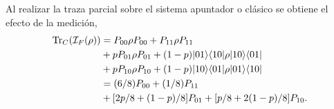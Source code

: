 Al realizar la traza parcial sobre el sistema apuntador o clásico se obtiene el efecto de la medición, \begin{equation}\label{traza_A1_ejemplo1}
    \begin{split}
        {\rm Tr}_C(\mathcal{I}_F(\rho)) &= P_{00} \rho P_{00} + P_{11}\rho P_{11}\\
        &+p P_{01}\rho P_{01}+(1-p) |01\rangle \langle 10|\rho|10\rangle \langle01|\\
        &+p P_{10}\rho P_{10}+(1-p) |10\rangle \langle 01|\rho|01\rangle \langle10|\\
        &=(6/8)P_{00} + (1/8)P_{11}\\
        &+[2p/8 +(1-p)/8]P_{01}+ [p/8+2(1-p)/8]P_{10}.\\
    \end{split}
\end{equation}
\begin{comment} %
Para la segunda alternativa se procede de forma parecida sin embargo el efecto de la medición es diferente, \begin{equation}\label{segunda_alternativa_ejemplo1}
    \begin{split}
        \mathcal{I}_2(\rho)&=\sum_{j,k}\mathcal{F}(P_{a_j,b_k})\otimes P_{a_j,b_k} \rho P_{a_j,b_k}\\
        &=P_{00}\otimes P_{00} \la 00|\rho|00\ra + P_{11}\otimes P_{11} \la 11|\rho|11\ra\\
        &+P_{01} \otimes [pP_{01} \la 01|\rho|01\ra+(1-p)P_{10}\la 10|\rho|10\ra]\\
        &+P_{10} \otimes [p P_{10}\la 10|\rho|10\ra+(1-p)P_{01}\la 01|\rho|01\ra]\\
        &=P_{00}\otimes (6/8)P_{00} + P_{11}\otimes (1/8)P_{11}\\
        &+   P_{01} \otimes [2p/8P_{01} +(1-p)/8P_{10}]+P_{10} \otimes[p/8 P_{10}+2(1-p)/8 P_{01}].\\
    \end{split}
\end{equation}


De nuevo, al realizar la traza parcial sobre le sistema cuántico se obtendrá la probabilidad de cada una de las salidas posibles \begin{equation}\label{traza_S2_ejemplo1}
    \begin{split}
        \tr_Q(\mathcal{I}_2(\rho)) &= P_{00} \la 00|\rho|00\ra + P_{11} \la 11|\rho|11\ra\\
        &+P_{01}[p \la 01|\rho|01\ra+(1-p)\la 10|\rho|10\ra]\\
        &+P_{10}[p \la 10|\rho|10\ra+(1-p)\la 01|\rho|01\ra]\\
        &=(6/8)P_{00} + (1/8)P_{11}\\
        &+[2p/8 +(1-p)/8]P_{01}+ [p/8+2(1-p)/8]P_{10}.\\
    \end{split}
\end{equation}


\end{comment}
